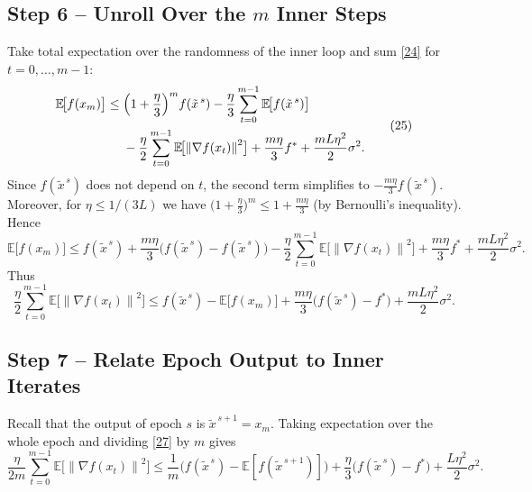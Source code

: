 \documentclass{article}
\newcommand{\EE}{\mathbb{E}}
\newcommand{\norm}[1]{\left\|#1\right\|}
\newcommand{\grad}{\nabla}
\begin{document}
\subsection*{Step 6 – Unroll Over the $m$ Inner Steps}
Take total expectation over the randomness of the inner loop and sum \eqref{24} for $t=0,\dots,m-1$:
\[
\begin{aligned}
\EE\!\bigl[f(x_{m})\bigr]
\le\;& \Bigl(1+\frac{\eta}{3}\Bigr)^{m}f(\tilde{x}^{\,s})
      -\frac{\eta}{3}\sum_{t=0}^{m-1}\EE\!\bigl[f(\tilde{x}^{\,s})\bigr]\\
      &-\frac{\eta}{2}\sum_{t=0}^{m-1}\EE\!\bigl[\norm{\grad f(x_t)}^{2}\bigr]
      +\frac{m\eta}{3}f^{*}
      +\frac{mL\eta^{2}}{2}\sigma^{2}.
\end{aligned}
\tag{25}
\]
Since $f(\tilde{x}^{\,s})$ does not depend on $t$, the second term simplifies to $-\frac{m\eta}{3}f(\tilde{x}^{\,s})$. Moreover, for $\eta\le 1/(3L)$ we have $\bigl(1+\frac{\eta}{3}\bigr)^{m}\le 1+\frac{m\eta}{3}$ (by Bernoulli's inequality). Hence
\[
\EE\!\bigl[f(x_{m})\bigr]
\le f(\tilde{x}^{\,s})+\frac{m\eta}{3}\bigl(f(\tilde{x}^{\,s})-f(\tilde{x}^{\,s})\bigr)
      -\frac{\eta}{2}\sum_{t=0}^{m-1}\EE\!\bigl[\norm{\grad f(x_t)}^{2}\bigr]
      +\frac{m\eta}{3}f^{*}
      +\frac{mL\eta^{2}}{2}\sigma^{2}.
\tag{26}
\]
Thus
\[
\frac{\eta}{2}\sum_{t=0}^{m-1}\EE\!\bigl[\norm{\grad f(x_t)}^{2}\bigr]
\le f(\tilde{x}^{\,s})- \EE\!\bigl[f(x_{m})\bigr]
      +\frac{m\eta}{3}\bigl(f(\tilde{x}^{\,s})-f^{*}\bigr)
      +\frac{mL\eta^{2}}{2}\sigma^{2}.
\tag{27}
\]

\subsection*{Step 7 – Relate Epoch Output to Inner Iterates}
Recall that the output of epoch $s$ is $\tilde{x}^{\,s+1}=x_{m}$. Taking expectation over the whole epoch and dividing \eqref{27} by $m$ gives
\[
\frac{\eta}{2m}\sum_{t=0}^{m-1}\EE\!\bigl[\norm{\grad f(x_t)}^{2}\bigr]
\le \frac{1}{m}\bigl(f(\tilde{x}^{\,s})- \EE[f(\tilde{x}^{\,s+1})]\bigr)
      +\frac{\eta}{3}\bigl(f(\tilde{x}^{\,s})-f^{*}\bigr)
      +\frac{L\eta^{2}}{2}\sigma^{2}.
\tag{28}
\]
\end{document}

